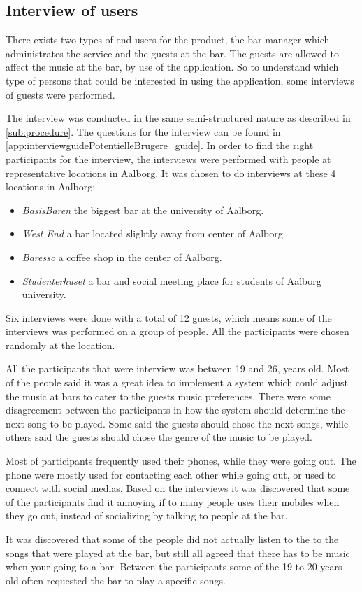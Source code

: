 \subsection{Interview of users}
\label{userInterviews}

There exists two types of end users for the product, the bar manager which administrates the service and the guests at the bar. The guests are allowed to affect the music at the bar, by use of the application. So to understand which type of persons that could be interested in using the application, some interviews of guests were performed.

The interview was conducted in the same semi-structured nature as described in \cref{sub:procedure}. The questions for the interview can be found in \cref{app:interviewguidePotentielleBrugere_guide}. In order to find the right participants for the interview, the interviews were performed with people at representative locations in Aalborg. It was chosen to do interviews at these 4 locations in Aalborg:

\begin{itemize}
    \item \emph{BasisBaren} the biggest bar at the university of Aalborg.
    \item \emph{West End} a bar located slightly away from center of Aalborg.
    \item \emph{Baresso} a coffee shop in the center of Aalborg.
    \item \emph{Studenterhuset} a bar and social meeting place for students of Aalborg university.
\end{itemize}

Six interviews were done with a total of 12 guests, which means some of the interviews was performed on a group of people. All the participants were chosen randomly at the location. 

All the participants that were interview was between 19 and 26, years old. Most of the people said it was a great idea to implement a system which could adjust the music at bars to cater to the guests music preferences. There were some disagreement between the participants in how the system should determine the next song to be played. Some said the guests should chose the next songs, while others said the guests should chose the genre of the music to be played.

Most of participants frequently used their phones, while they were going out. The phone were mostly used for contacting each other while going out, or used to connect with social medias. 
Based on the interviews it was discovered that some of the participants find it annoying if to many people uses their mobiles when they go out, instead of socializing by talking to people at the bar.  

It was discovered that some of the people did not actually listen to the to the songs that were played at the bar, but still all agreed that there has to be music when your going to a bar. Between the participants some of the 19 to 20 years old often requested the bar to play a specific songs. 
